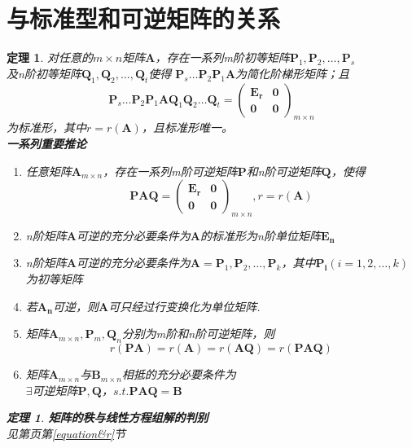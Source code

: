 \documentclass[12pt,oneside]{ctexbook}
\newtheorem{theorem}[subsection]{定理}
\begin{document}
\section{与标准型和可逆矩阵的关系}
\begin{theorem}
    对任意的\(m\times n\)矩阵\(\mathbf{A}\)，存在一系列m阶初等矩阵\(\mathbf{P}_1,\mathbf{P}_2,\dots,\mathbf{P}_s\)
    \\及n阶初等矩阵\(\mathbf{Q}_1,\mathbf{Q}_2,\dots,\mathbf{Q}_t\)使得
    \(\mathbf{P}_s\dots \mathbf{P}_2\mathbf{P}_1\mathbf{A}\)为简化阶梯形矩阵；且
    \[\mathbf{P}_s\dots \mathbf{P}_2\mathbf{P}_1\mathbf{A}\mathbf{Q}_1\mathbf{Q}_2\dots\mathbf{Q}_t
    =\begin{pmatrix}
        \mathbf{E_r}&\mathbf{0}
        \\ \mathbf{0}&\mathbf{0}
    \end{pmatrix}_{m \times n}\]
    为标准形，其中\(r=r(\mathbf{A})\)，且标准形唯一。
    \\ \textbf{一系列重要推论}
    \begin{enumerate}
        \item 任意矩阵\(\mathbf{A}_{m \times n}\)，存在一系列m阶可逆矩阵\(\mathbf{P}\)和n阶可逆矩阵\(\mathbf{Q}\)，使得
        \[ \mathbf{P}\mathbf{A}\mathbf{Q}=\begin{pmatrix}
            \mathbf{E_r}&\mathbf{0}
            \\ \mathbf{0}&\mathbf{0}
        \end{pmatrix}_{m \times n},r=r(\mathbf{A})\]
        \item n阶矩阵\(\mathbf{A}\)可逆的充分必要条件为\(\mathbf{A}\)的标准形为n阶单位矩阵\(\mathbf{E_n}\)
        \item n阶矩阵\(\mathbf{A}\)可逆的充分必要条件为\(\mathbf{A}=\mathbf{P}_1,\mathbf{P}_2,\dots,\mathbf{P}_k\)，其中\(\mathbf{P_i}(i=1,2,\dots,k)\)为初等矩阵
        \item 若\(\mathbf{A_n}\)可逆，则\(\mathbf{A}\)可只经过行变换化为单位矩阵.
        \item 矩阵\(\mathbf{A}_{m\times n},\mathbf{P}_m,\mathbf{Q}_n\)分别为m阶和n阶可逆矩阵，则\[r(\mathbf{P}\mathbf{A})=r(\mathbf{A})=r(\mathbf{A}\mathbf{Q})=r(\mathbf{P}\mathbf{A}\mathbf{Q})\]
        \item 矩阵\(\mathbf{A}_{m \times n}\)与\(\mathbf{B}_{m \times n}\)相抵的充分必要条件为
        \\ \(\exists\)可逆矩阵\(\mathbf{P},\mathbf{Q}\)，\(s.t. \mathbf{P}\mathbf{A}\mathbf{Q}=\mathbf{B}\)
    \end{enumerate}
    \begin{theorem}
        \textbf{矩阵的秩与线性方程组解的判别}
        \\见第\pageref{equation&r}页第\ref{equation&r}节
    \end{theorem}
\end{theorem}
\end{document}
